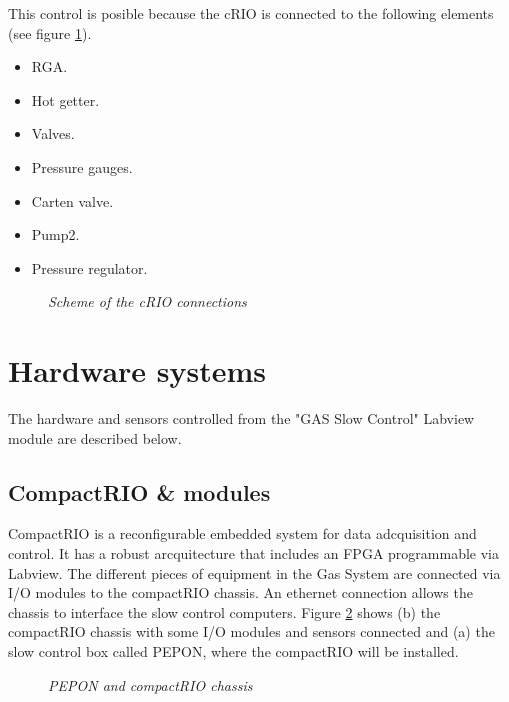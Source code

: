 This control is posible because the cRIO is connected to the following elements (see figure \ref{fig:cRIO:cRIO}).

\begin{itemize}
\item RGA.
\item Hot getter.
\item Valves.
\item Pressure gauges.
\item Carten valve.
\item Pump2.
\item Pressure regulator.
\end{itemize}

\begin{figure}[ht!]
    \bigskip
    \begin{center}\leavevmode
        \caption{\textit{Scheme of the cRIO connections}}
        \label{fig:cRIO:cRIO}
    \end{center}
\end{figure}

\vspace{10cm}

\section{Hardware systems}

The hardware and sensors controlled from the "GAS Slow Control" Labview module are described below.

\subsection{CompactRIO \& modules}

CompactRIO is a reconfigurable embedded system for data adcquisition and control. It has a robust arcquitecture that includes an FPGA programmable via Labview. 
The different pieces of equipment in the Gas System are connected via I/O modules to the compactRIO chassis. An ethernet connection allows the chassis to interface the slow control computers. 
Figure \ref{fig:HARDWARE:RIO} shows (b) the compactRIO chassis with some I/O modules and sensors connected and (a) the slow control box called PEPON, where the compactRIO will be installed.

\begin{figure}[ht!]
  \centering
  \caption{\textit{PEPON and compactRIO chassis}}
  \label{fig:HARDWARE:RIO}
  \end{figure}

